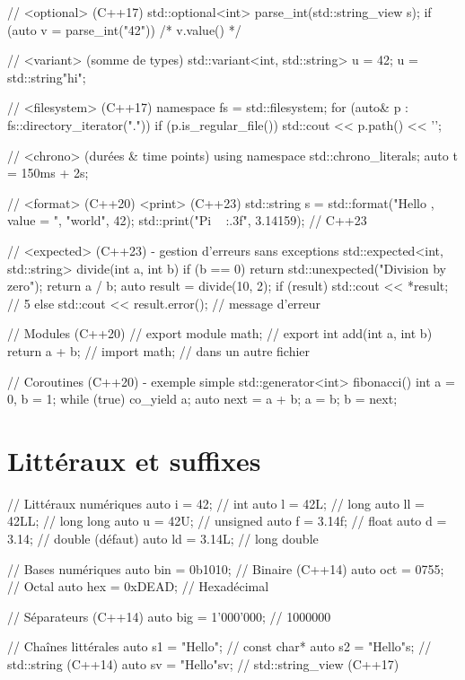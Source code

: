 \documentclass{article}
\begin{document}
\begin{multicols*}{4}
\begin{cppcode}
// <optional> (C++17)
std::optional<int> parse_int(std::string_view s);
if (auto v = parse_int("42")) { /* v.value() */ }

// <variant> (somme de types)
std::variant<int, std::string> u = 42;
u = std::string{"hi"};

// <filesystem> (C++17)
namespace fs = std::filesystem;
for (auto& p : fs::directory_iterator(".")) {
    if (p.is_regular_file()) std::cout << p.path() << '\n';
}

// <chrono> (durées & time points)
using namespace std::chrono_literals;
auto t = 150ms + 2s;

// <format> (C++20) <print> (C++23)
std::string s = std::format("Hello {}, value = {}", "world", 42);
std::print("Pi ~ {:.3f}\n", 3.14159); // C++23

// <expected> (C++23) - gestion d'erreurs sans exceptions
std::expected<int, std::string> divide(int a, int b) {
    if (b == 0) return std::unexpected("Division by zero");
    return a / b;
}
auto result = divide(10, 2);
if (result) std::cout << *result; // 5
else std::cout << result.error(); // message d'erreur

// Modules (C++20)
// export module math;
// export int add(int a, int b) { return a + b; }
// import math; // dans un autre fichier

// Coroutines (C++20) - exemple simple
std::generator<int> fibonacci() {
    int a = 0, b = 1;
    while (true) {
        co_yield a;
        auto next = a + b;
        a = b; b = next;
    }
}
\end{cppcode}

\section*{Littéraux et suffixes}
\begin{cppcode}
// Littéraux numériques
auto i = 42;        // int
auto l = 42L;       // long
auto ll = 42LL;     // long long
auto u = 42U;       // unsigned
auto f = 3.14f;     // float
auto d = 3.14;      // double (défaut)
auto ld = 3.14L;    // long double

// Bases numériques
auto bin = 0b1010;  // Binaire (C++14)
auto oct = 0755;    // Octal
auto hex = 0xDEAD;  // Hexadécimal

// Séparateurs (C++14)
auto big = 1'000'000; // 1000000

// Chaînes littérales
auto s1 = "Hello";     // const char*
auto s2 = "Hello"s;    // std::string (C++14)
auto sv = "Hello"sv;   // std::string_view (C++17)


\end{cppcode}
\end{multicols*}
\end{document}
